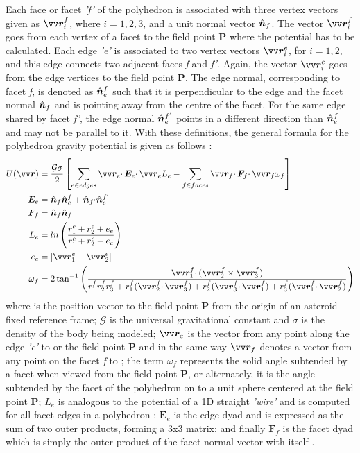 \FloatBarrier
Each face or facet \textit{'f'} of the polyhedron is associated with three vertex vectors given as $\bvector{r}_i^f$, where $i=1,2,3$, and a unit normal vector $\hat{\bm{n}}_f$. The vector $\bv{r}_i^f$ goes from each vertex of a facet to the field point \textbf{P} where the potential has to be calculated. Each edge \textit{'e'} is associated to two vertex vectors $\bvector{r}_i^e$, for $i=1,2$, and this edge connects two adjacent faces \textit{f} and \textit{f'}. Again, the vector $\bv{r}_i^e$ goes from the edge vertices to the field point \textbf{P}. The edge normal, corresponding to facet \textit{f}, is denoted as $\hat{\bm{n}}_e^f$ such that it is perpendicular to the edge and the facet normal $\hat{\bm{n}}_f$ and is pointing away from the centre of the facet. For the same edge shared by facet \textit{f'}, the edge normal $\hat{\bm{n}}_e^{f'}$ points in a different direction than $\hat{\bm{n}}_e^f$ and may not be parallel to it. With these definitions, the general formula for the polyhedron gravity potential is given as follows \parencite{scheeresBook}:
\begin{align}
    U(\bvector{r}) &= \frac{\mathcal{G}\sigma}{2} \left[ \sum_{e\in edges} \bvector{r}_e \cdotp \bm{E}_e \cdotp \bvector{r}_e L_e - \sum_{f\in faces} \bvector{r}_f \cdotp \bm{F}_f \cdotp \bvector{r}_f \omega_f \right]
    \label{eqn:polyhedron_potential} \\
    \bm{E}_e &= \buvec{n}_f \buvec{n}_e^f + \buvec{n}_{f'} \buvec{n}_e^{f'}
    \label{eqn:polyhedron_E_term} \\
    \bm{F}_f &= \buvec{n}_f \buvec{n}_f
    \label{eqn:polyhedron_F_term} \\
    L_e &= ln\left(\frac{r_1^e + r_2^e + e_e}{r_1^e + r_2^e - e_e} \right)
    \label{eqn:polyhedron_L_term} \\
    e_e &= |\bvector{r}_1^e - \bvector{r}_2^e|
    \label{eqn:polyhedron_e_term} \\
    \omega_f &= 2 \tan^{-1} \left(\frac{\bv{r}_1^f \cdotp (\bv{r}_2^f \times \bv{r}_3^f)}{r_1^f r_2^f r_3^f + r_1^f(\bv{r}_2^f \cdotp \bv{r}_3^f) + r_2^f(\bv{r}_3^f \cdotp \bv{r}_1^f) + r_3^f(\bv{r}_1^f \cdotp \bv{r}_2^f)} \right)
\end{align}
where  is the position vector to the field point \textbf{P} from the origin of an asteroid-fixed reference frame; $\mathcal{G}$ is the universal gravitational constant and $\sigma$ is the density of the body being modeled; $\bvector{r}_e$ is the vector from any point along the edge \textit{'e'} to  or the field point \textbf{P} and in the same way $\bvector{r}_f$ denotes a vector from any point on the facet \textit{f} to  \parencite{scheeresBook}; the term $\omega_f$ represents the solid angle subtended by a facet when viewed from the field point \textbf{P}, or alternately, it is the angle subtended by the facet of the polyhedron on to a unit sphere centered at the field point \textbf{P}; $L_e$ is analogous to the potential of a 1D straight \textit{'wire'} and is computed for all facet edges in a polyhedron \parencite{scheeres_polyhedra}; $\bm{E}_e$ is the edge dyad and is expressed as the sum of two outer products, forming a 3x3 matrix; and finally $\bm{F}_f$ is the facet dyad which is simply the outer product of the facet normal vector with itself \parencite{scheeres_polyhedra}.
